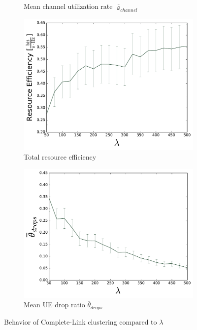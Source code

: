 \begin{figure}[H]
\begin{subfigure}[b]{0.5\linewidth}
    \caption{Mean channel utilization rate $\overline{\varrho}_{channel}$} 
    \label{fig:COMPLETE_8} 
    \vspace{4ex}
  \end{subfigure} 
  \begin{subfigure}[b]{0.5\linewidth}
    \centering
    \captionsetup{justification=centering}
    \includegraphics[width=1\linewidth]{figures/COMPLETE_9} 
    \caption{Total resource efficiency} 
    \label{fig:COMPLETE_9} 
  \end{subfigure}%
  \begin{subfigure}[b]{0.5\linewidth}
    \centering
    \captionsetup{justification=centering}
    \includegraphics[width=1\linewidth]{figures/COMPLETE_10} 
    \caption{Mean UE drop ratio $\overline{\theta}_{drops}$} 
    \label{fig:COMPLETE_10} 
  \end{subfigure} 
  \caption{Behavior of Complete-Link clustering compared to $\lambda$}
  \label{fig:pretty_results_COMPLETE} 
\end{figure}

